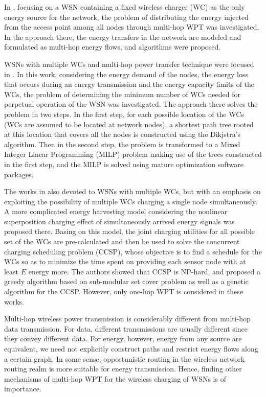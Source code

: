 \documentclass[journal,10pt]{IEEEtran}
\begin{document}
In \cite{Xiang2013}, focusing on a WSN containing a fixed wireless charger (WC) as the only energy source for the network, the problem of distributing the energy injected from the access point among all nodes through multi-hop WPT was investigated. In the approach there, the energy transfers in the network are modeled and formulated as multi-hop energy flows, and algorithms were proposed.

WSNs with multiple WCs and multi-hop power transfer technique were focused in \cite{Rault2013}. In this work, considering the energy demand of the nodes, the energy loss that occurs during an energy transmission and the energy capacity limits of the WCs, the problem of determining the minimum number of WCs needed for perpetual operation of the WSN was investigated. The approach there solves the problem in two steps. In the first step, for each possible location of the WCs (WCs are assumed to be located at network nodes), a shortest path tree rooted at this location that covers all the nodes is constructed using the Dikjstra's algorithm. Then in the second step, the problem is transformed to a Mixed Integer Linear Programming (MILP) problem making use of the trees constructed in the first step, and the MILP is solved using mature optimization software packages.

The works in \cite{Guo2017,Guo2016} also devoted to WSNs with multiple WCs, but with an emphasis on exploiting the possibility of multiple WCs charging a single node simultaneously. A more complicated energy harvesting model considering the nonlinear superposition charging effect of simultaneously arrived energy signals was proposed there. Basing on this model, the joint charging utilities for all possible set of the WCs are pre-calculated and then be used to solve the concurrent charging scheduling problem (CCSP), whose objective is to find a schedule for the WCs so as to minimize the time spent on providing each sensor node with at least $E$ energy more. The authors showed that CCSP is NP-hard, and proposed a greedy algorithm based on sub-modular set cover problem as well as a genetic algorithm for the CCSP. However, only one-hop WPT is considered in these works.

Multi-hop wireless power transmission is considerably different from multi-hop data transmission. For data, different transmissions are usually different since they convey different data. For energy, however, energy from any source are equivalent, we need not explicitly construct paths and restrict energy flows along a certain graph. In some sense, opportunistic routing in the wireless network routing realm is more suitable for energy transmission. Hence, finding other mechanisms of multi-hop WPT for the wireless charging of WSNs is of importance.
\end{document}
